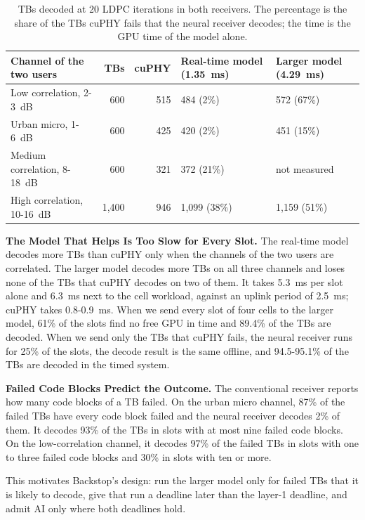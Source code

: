 \documentclass[acmsmall,screen,review,anonymous]{acmart}
\newcommand{\sys}{Backstop\xspace}
\begin{document}
\begin{table}[t]
\caption{TBs decoded at 20 LDPC iterations in both receivers. The percentage is the share of the TBs cuPHY
fails that the neural receiver decodes; the time is the GPU time of the model alone.}
\label{tab:receivers}
\footnotesize
\begin{tabular}{@{}lrrll@{}}
\toprule
Channel of the two users & TBs & cuPHY & Real-time model (1.35~ms) & Larger model (4.29~ms) \\
\midrule
Low correlation, 2-3~dB & 600 & 515 & 484 (2\%) & 572 (67\%) \\
Urban micro, 1-6~dB & 600 & 425 & 420 (2\%) & 451 (15\%) \\
Medium correlation, 8-18~dB & 600 & 321 & 372 (21\%) & not measured \\
High correlation, 10-16~dB & 1,400 & 946 & 1,099 (38\%) & 1,159 (51\%) \\
\bottomrule
\end{tabular}
\end{table}

\noindent\textbf{The Model That Helps Is Too Slow for Every Slot.} The real-time model decodes more TBs
than cuPHY only when the channels of the two users are correlated. The larger model decodes more TBs on all
three channels and loses none of the TBs that cuPHY decodes on two of them. It takes 5.3~ms per slot alone
and 6.3~ms next to the cell workload, against an uplink period of 2.5~ms; cuPHY takes 0.8-0.9~ms. When we
send every slot of four cells to the larger model, 61\% of the slots find no free GPU in time and 89.4\% of
the TBs are decoded. When we send only the TBs that cuPHY fails, the neural receiver runs for 25\% of the
slots, the decode result is the same offline, and 94.5-95.1\% of the TBs are decoded in the timed system.

\noindent\textbf{Failed Code Blocks Predict the Outcome.} The conventional receiver reports how many code
blocks of a TB failed. On the urban micro channel, 87\% of the failed TBs have every code block failed and
the neural receiver decodes 2\% of them. It decodes 93\% of the TBs in slots with at most nine failed code
blocks. On the low-correlation channel, it decodes 97\% of the failed TBs in slots with one to three failed
code blocks and 30\% in slots with ten or more.

This motivates \sys's design: run the larger model only for failed TBs that it is likely to decode, give
that run a deadline later than the layer-1 deadline, and admit AI only where both deadlines hold.
\end{document}

